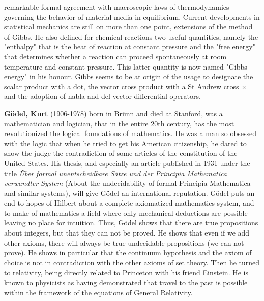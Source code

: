 remarkable formal agreement with macroscopic laws of thermodynamics governing the behavior of material media in equilibrium. Current developments in statistical mechanics are still on more than one point, extensions of the method of Gibbs. He also defined for chemical reactions two useful quantities, namely the "enthalpy" that is the heat of reaction at constant pressure and the "free energy" that determines whether a reaction can proceed spontaneously at room temperature and constant pressure. This latter quantity is now named "Gibbs energy" in his honour. Gibbs seems to be at origin of the usage to designate the scalar product with a dot, the vector cross product with a St Andrew cross $\times$ and the adoption of nabla and del vector differential operators.

\textbf{Gödel, Kurt} (1906-1978) born in Brünn and died at Stanford, was a mathematician and logician, that in the entire 20th century, has the most revolutionized the logical foundations of mathematics. He was a man so obsessed with the logic that when he tried to get his American citizenship, he dared to show the judge the contradiction of some articles of the constitution of the United States. His thesis, and especially an article published in 1931 under the title \textit{Über formal unentscheidbare Sätze und der Principia Mathematica verwandter System} (About the undecidability of formal Principia Mathematica and similar systems), will give Gödel an international reputation. Gödel puts an end to hopes of Hilbert about a complete axiomatized mathematics system, and to make of mathematics a field where only mechanical deductions are possible leaving no place for intuition. Thus, Gödel shows that there are true propositions about integers, but that they can not be proved. He shows that even if we add other axioms, there will always be true undecidable propositions (we can not prove). He shows in particular that the continuum hypothesis and the axiom of choice is not in contradiction with the other axioms of set theory. Then he turned to relativity, being directly related to Princeton with his friend Einstein. He is known to physicists as having demonstrated that travel to the past is possible within the framework of the equations of General Relativity.

